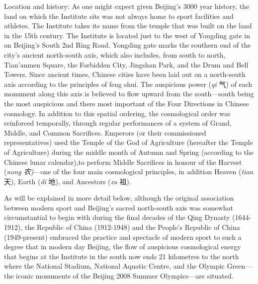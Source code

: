 Location and history:
As one might expect given Beijing's 3000 year history, the land on which the Institute sits was not always home to sport facilities and athletes. The Institute takes its name from the temple that was built on the land in the 15th century. The Institute is located just to the west of Yongding gate in on Beijing's South 2nd Ring Road.  Yongding gate marks the southern end of the city's ancient north-south axis, which also includes, from south to north, Tian'anmen Square, the Forbidden City, Jingshan Park, and the Drum and Bell Towers.  Since ancient times, Chinese cities have been laid out on a north-south axis according to the principles of feng shui. The auspicious power (\textit{qi} 气) of each monument along this axis is believed to flow upward from the south---south being the most auspicious and there most important of the Four Directions in Chinese cosmology.  In addition to this spatial ordering, the cosmological order was reinforced temporally, through regular performances of a system of Grand, Middle, and Common Sacrifices.  Emperors (or their commissioned representatives) used the Temple of the God of Agriculture (hereafter the Temple of Agriculture) during the middle month of Autumn and Spring (according to the Chinese lunar calendar),to perform Middle Sacrifices in honour of the Harvest (\textit{nong 农)}---one of the four main cosmological principles, in addition Heaven (\textit{tian} 天), Earth (\textit{di} 地), and Ancestors (\textit{zu} 祖)\citep[98]{Brownell2008}.

As will be explained in more detail below, although the original association between modern sport and Beijing's sacred north-south axis was somewhat circumstantial to begin with during the final decades of the Qing Dynasty (1644-1912), the Republic of China (1912-1948) and the People's Republic of China (1949-present) embraced the practice and spectacle of modern sport to such a degree that in modern day Beijing, the flow of auspicious cosmological energy that begins at the Institute in the south now ends 21 kilometres to the north where the National Stadium, National Aquatic Centre, and the Olympic Green---the iconic monuments of the Beijing 2008 Summer Olympics---are situated.


